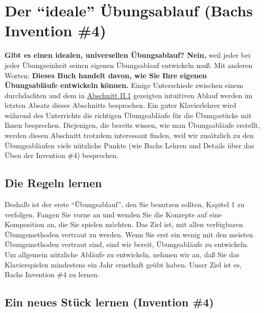 
\section{Der \enquote{ideale} Übungsablauf (Bachs Invention \#4)}\hypertarget{c1iii19}{}

\textbf{Gibt es einen idealen, universellen Übungsablauf?
Nein,} weil jeder bei jeder Übungseinheit seinen eigenen Übungsablauf entwickeln muß.
Mit anderen Worten: \textbf{Dieses Buch handelt davon, wie Sie Ihre eigenen Übungsabläufe entwickeln können.}
Einige Unterschiede zwischen einem durchdachten und dem in \hyperlink{c1ii1}{Abschnitt II.1} gezeigten intuitiven Ablauf werden im letzten Absatz dieses Abschnitts besprochen.
Ein guter Klavierlehrer wird während des Unterrichts die richtigen Übungsabläufe für die Übungsstücke mit Ihnen besprechen.
Diejenigen, die bereits wissen, wie man Übungsabläufe erstellt, werden diesen Abschnitt trotzdem interessant finden, weil wir zusätzlich zu den Übungsabläufen viele nützliche Punkte (wie Bachs Lehren und Details über das Üben der Invention \#4) besprechen.


\subsection{Die Regeln lernen}\hypertarget{c1iii19a}{}

Deshalb ist der erste \enquote{Übungsablauf}, den Sie benutzen sollten, Kapitel 1 zu verfolgen.
Fangen Sie vorne an und wenden Sie die Konzepte auf eine Komposition an, die Sie spielen möchten.
Das Ziel ist, mit allen verfügbaren Übungsmethoden vertraut zu werden.
Wenn Sie erst ein wenig mit den meisten Übungsmethoden vertraut sind, sind wir bereit, Übungsabläufe zu entwickeln.
Um allgemein nützliche Abläufe zu entwickeln, nehmen wir an, daß Sie das Klavierspielen mindestens ein Jahr ernsthaft geübt haben.
Unser Ziel ist es, Bachs Invention \#4 zu lernen.


\subsection{Ein neues Stück lernen (Invention \#4)}\hypertarget{c1iii19b}{}

